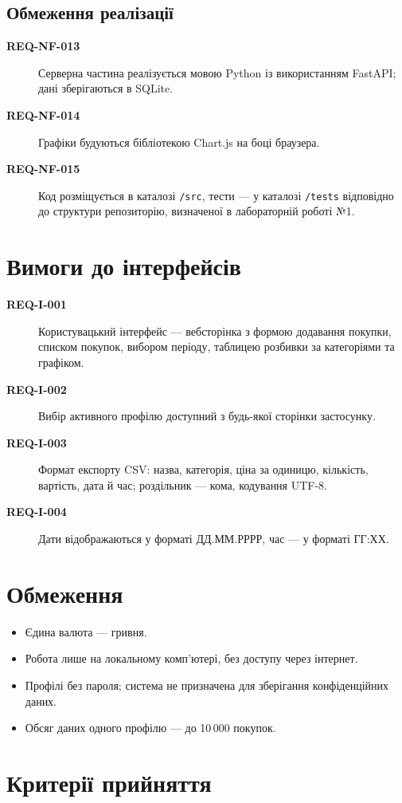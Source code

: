 \documentclass[12pt,a4paper]{article}
\newcommand{\req}[2]{\item[\textbf{#1}] #2}
\begin{document}
\subsection{Обмеження реалізації}
\begin{description}
\req{REQ-NF-013}{Серверна частина реалізується мовою Python із використанням FastAPI; дані зберігаються в SQLite.}
\req{REQ-NF-014}{Графіки будуються бібліотекою Chart.js на боці браузера.}
\req{REQ-NF-015}{Код розміщується в каталозі \texttt{/src}, тести --- у каталозі \texttt{/tests} відповідно до структури репозиторію, визначеної в лабораторній роботі №1.}
\end{description}

\section{Вимоги до інтерфейсів}
\begin{description}
\req{REQ-I-001}{Користувацький інтерфейс --- вебсторінка з формою додавання покупки, списком покупок, вибором періоду, таблицею розбивки за категоріями та графіком.}
\req{REQ-I-002}{Вибір активного профілю доступний з будь-якої сторінки застосунку.}
\req{REQ-I-003}{Формат експорту CSV: назва, категорія, ціна за одиницю, кількість, вартість, дата й час; роздільник --- кома, кодування UTF-8.}
\req{REQ-I-004}{Дати відображаються у форматі ДД.ММ.РРРР, час --- у форматі ГГ:ХХ.}
\end{description}

\section{Обмеження}
\begin{itemize}
  \item Єдина валюта --- гривня.
  \item Робота лише на локальному комп'ютері, без доступу через інтернет.
  \item Профілі без пароля; система не призначена для зберігання конфіденційних даних.
  \item Обсяг даних одного профілю --- до 10\,000 покупок.
\end{itemize}

\section{Критерії прийняття}
\end{document}
